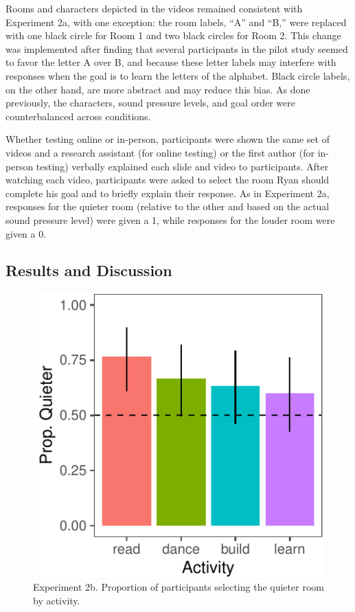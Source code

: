 \documentclass[10pt, letterpaper]{article}
\newenvironment{CodeChunk}{}{}
\begin{document}
Rooms and characters depicted in the videos remained consistent with
Experiment 2a, with one exception: the room labels, ``A'' and ``B,''
were replaced with one black circle for Room 1 and two black circles for
Room 2. This change was implemented after finding that several
participants in the pilot study seemed to favor the letter A over B, and
because these letter labels may interfere with responses when the goal
is to learn the letters of the alphabet. Black circle labels, on the
other hand, are more abstract and may reduce this bias. As done
previously, the characters, sound pressure levels, and goal order were
counterbalanced across conditions.

Whether testing online or in-person, participants were shown the same
set of videos and a research assistant (for online testing) or the first
author (for in-person testing) verbally explained each slide and video
to participants. After watching each video, participants were asked to
select the room Ryan should complete his goal and to briefly explain
their response. As in Experiment 2a, responses for the quieter room
(relative to the other and based on the actual sound pressure level)
were given a 1, while responses for the louder room were given a 0.

\hypertarget{results-and-discussion-3}{%
\subsection{Results and Discussion}\label{results-and-discussion-3}}

\begin{CodeChunk}
\begin{figure}[t]

{\centering \includegraphics{figs/2b-bar-1} 

}

\caption[Experiment 2b]{Experiment 2b. Proportion of participants selecting the quieter room by activity.}\label{fig:2b-bar}
\end{figure}
\end{CodeChunk}
\end{document}
